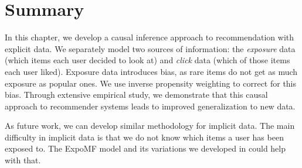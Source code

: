 \section{Summary}

In this chapter, we develop a causal inference approach to recommendation with explicit data. We separately model two sources of information: the \textit{exposure} data (which items each user decided to look at) and \textit{click} data (which of
those items each user liked). Exposure data introduces bias, as rare items do not get as much exposure as popular ones. We use inverse propensity weighting to correct for this bias. Through extensive empirical study, we demonstrate that this causal approach to recommender systems leads to improved generalization to new data.

As future work, we can develop similar methodology for implicit data. The main difficulty in implicit data is that we do not know which items a user has been exposed to. The ExpoMF model and its variations we developed in  could help with that.  






